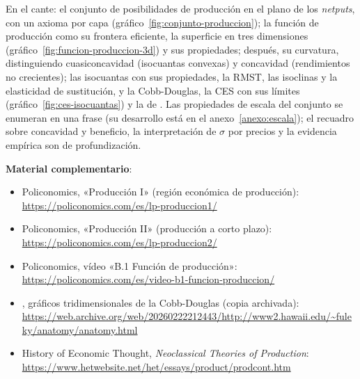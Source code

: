 \documentclass[11pt]{article}
\begin{document}
\begin{infografia}[H]
\centering
\caption{Del conjunto de posibilidades de producción a la función de producción y las isocuantas}\label{figu:esquema-tecnologia}
\end{infografia}

\begin{notaopositor}
En el cante: el conjunto de posibilidades de producción en el plano de los \emph{netputs}, con un axioma por capa (gráfico~\ref{fig:conjunto-produccion}); la función de producción como su frontera eficiente, la superficie en tres dimensiones (gráfico~\ref{fig:funcion-produccion-3d}) y sus propiedades; después, su curvatura, distinguiendo cuasiconcavidad (isocuantas convexas) y concavidad (rendimientos no crecientes); las isocuantas con sus propiedades, la RMST, las isoclinas y la elasticidad de sustitución, y la Cobb-Douglas, la CES con sus límites (gráfico~\ref{fig:ces-isocuantas}) y la de . Las propiedades de escala del conjunto se enumeran en una frase (su desarrollo está en el anexo~\ref{anexo:escala}); el recuadro sobre concavidad y beneficio, la interpretación de $\sigma$ por precios y la evidencia empírica son de profundización.
\end{notaopositor}

\begin{anotaciones}
\textbf{Material complementario}:
\begin{itemize}
\item Policonomics, «Producción I» (región económica de producción): \url{https://policonomics.com/es/lp-produccion1/}
\item Policonomics, «Producción II» (producción a corto plazo): \url{https://policonomics.com/es/lp-produccion2/}
\item Policonomics, vídeo «B.1 Función de producción»: \url{https://policonomics.com/es/video-b1-funcion-produccion/}
\item \textcite{FulekyAnatomy}, gráficos tridimensionales de la Cobb-Douglas (copia archivada): \url{https://web.archive.org/web/20260222212443/http://www2.hawaii.edu/~fuleky/anatomy/anatomy.html}
\item History of Economic Thought, \emph{Neoclassical Theories of Production}: \url{https://www.hetwebsite.net/het/essays/product/prodcont.htm}
\end{itemize}
\end{anotaciones}

\end{document}
